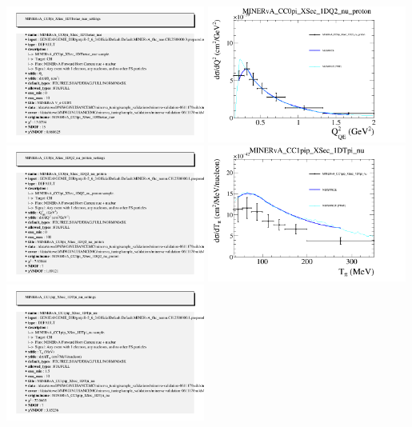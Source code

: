 \documentclass{article}
\begin{document}
\includegraphics[width=0.49\textwidth]{figures/nuisance_MINERvA_CC0pi_XSec_1DThetae_nue_info.png}
\centering
\includegraphics[width=0.49\textwidth]{figures/nuisance_MINERvA_CC0pi_XSec_1DQ2_nu_proton_comp.png}
\includegraphics[width=0.49\textwidth]{figures/nuisance_MINERvA_CC0pi_XSec_1DQ2_nu_proton_info.png}
\centering
\includegraphics[width=0.49\textwidth]{figures/nuisance_MINERvA_CC1pip_XSec_1DTpi_nu_comp.png}
\includegraphics[width=0.49\textwidth]{figures/nuisance_MINERvA_CC1pip_XSec_1DTpi_nu_info.png}
\end{document}

